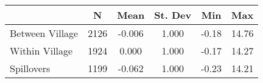 \begin{tabular}{l*{5}{c}}\hline&\multicolumn{1}{c}{N}&\multicolumn{1}{c}{Mean}&\multicolumn{1}{c}{St. Dev}&\multicolumn{1}{c}{Min}&\multicolumn{1}{c}{Max}\\ \hline 
Between Village & 2126 & -0.006 & 1.000 & -0.18 & 14.76 \\
Within Village & 1924 & 0.000 & 1.000 & -0.17 & 14.27 \\
Spillovers & 1199 & -0.062 & 1.000 & -0.23 & 14.21 \\
\hline \end{tabular}
